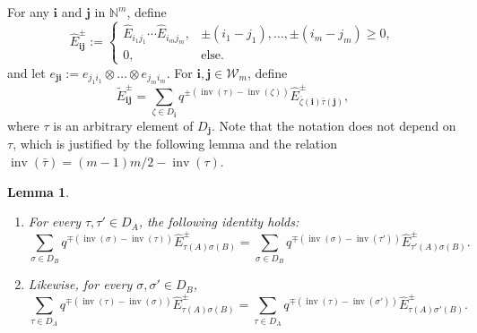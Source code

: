 \documentclass[11pt]{article}
\numberwithin{equation}{section}
\numberwithin{equation}{section}
\newtheorem{Lemma}[Theorem]{Lemma}
\DeclareMathOperator{\inv}{inv}
\newcommand{\ii}{{\mathbf{i}}}
\newcommand{\jj}{{\mathbf{j}}}
\begin{document}
For any $ \ii $ and $ \jj $ in $ \mathbb{N}^m $, define
\[
\hat{E}^{\pm}_{\ii \jj} :=
\begin{cases}
\hat{E}_{i_1j_1}\cdots \hat{E}_{i_mj_m}, & \pm(i_1-j_1),\dots,\pm(i_m-j_m)\geq 0,\\
0, & \text{else}.
\end{cases}
\]
 and let $ e_{ \jj \ii }:= e_{j_1i_1} \otimes \dots \otimes e_{j_mi_m}$. For $\ii, \jj \in \mathcal{W}_m$, define
\[
\tilde{E}^{\pm}_{\ii\jj} =
\sum_{\zeta \in D_{\ii}}q^{\pm(\inv(\tau) -\inv(\zeta))}\hat{E}^{\pm}_{\bar{\zeta}(\ii)\bar{\tau}(\jj)},
\]
where $\tau$ is an arbitrary element of $D_{\jj}$. Note that the notation does not depend on $\tau$, which is justified by the following lemma and the relation $\inv(\bar{\tau}) = (m-1)m/2 - \inv(\tau)$.

\begin{Lemma} \label{prop 1}\quad
	\begin{enumerate}\itemsep=0pt
		\item[$1.$] For every $\tau,\tau' \in D_A$, the following identity holds: \begin{equation*}%
		\sum_{\sigma\in D_B} q^{\mp (\inv(\sigma)-\inv(\tau))} \hat{E}^{\pm}_{\tau(A) \sigma (B)} = \sum_{\sigma\in D_B} q^{\mp (\inv(\sigma)-\inv(\tau'))} \hat{E}^{\pm}_{\tau'(A) \sigma (B)} .
		\end{equation*} 	 	
		\item[$2.$] Likewise, for every $\sigma,\sigma' \in D_B$, \begin{equation*}%
		\sum_{\tau\in D_A} q^{\mp (\inv(\tau)-\inv(\sigma))} \hat{E}^{\pm}_{\tau(A) \sigma (B)} = \sum_{\tau\in D_A} q^{\mp (\inv(\tau)-\inv(\sigma'))} \hat{E}^{\pm}_{\tau(A) \sigma' (B)} .
		\end{equation*} 	 	
	\end{enumerate}
	\end{Lemma}
\end{document}
